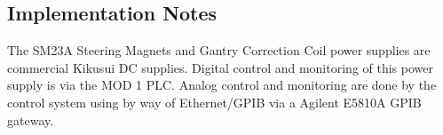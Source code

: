 \documentclass[11pt]{book}		%
\begin{document}
\subsection{Implementation Notes} \label{sect:cyc-equip-ctl-beamline-sm23a-implementation}

The SM23A Steering Magnets and Gantry Correction Coil power supplies are commercial Kikusui DC supplies.  Digital control and monitoring of this power supply is via the MOD 1 PLC.  Analog control and monitoring are done by the control system using by way of Ethernet/GPIB via a Agilent E5810A GPIB gateway.
\end{document}
